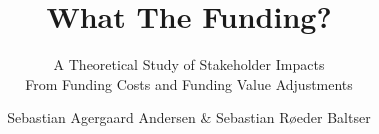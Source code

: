 \title{What The Funding?}
\subtitle{
    A Theoretical Study of Stakeholder Impacts \\
    From Funding Costs and Funding Value Adjustments
}
\author[Andersen \& Baltser]{
    Sebastian Agergaard Andersen \& Sebastian Røeder Baltser
}